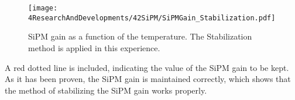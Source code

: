 \begin{figure}[hbtp]
\centering
\texttt{[image: 4ResearchAndDevelopments/42SiPM/SiPMGain\_Stabilization.pdf]}
\caption{SiPM gain as a function of the temperature. The Stabilization method is applied in this experience. \label{fig:SiPMGainStabilization}}
\end{figure}

A red dotted line is included, indicating the value of the SiPM gain to be kept. As it has been proven, the SiPM gain is maintained correctly, which shows that the method of stabilizing the SiPM gain works properly.